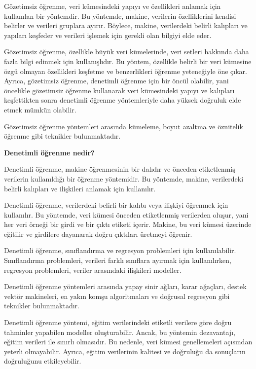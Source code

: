 \documentclass[11pt]{article}
\begin{document}
Gözetimsiz öğrenme, veri kümesindeki yapıyı ve özellikleri anlamak için kullanılan bir yöntemdir. Bu yöntemde, makine, verilerin özelliklerini kendisi belirler ve verileri gruplara ayırır. Böylece, makine, verilerdeki belirli kalıpları ve yapıları keşfeder ve verileri işlemek için gerekli olan bilgiyi elde eder.

Gözetimsiz öğrenme, özellikle büyük veri kümelerinde, veri setleri hakkında daha fazla bilgi edinmek için kullanışlıdır. Bu yöntem, özellikle belirli bir veri kümesine özgü olmayan özellikleri keşfetme ve benzerlikleri öğrenme yeteneğiyle öne çıkar. Ayrıca, gözetimsiz öğrenme, denetimli öğrenme için bir öncül olabilir, yani öncelikle gözetimsiz öğrenme kullanarak veri kümesindeki yapıyı ve kalıpları keşfettikten sonra denetimli öğrenme yöntemleriyle daha yüksek doğruluk elde etmek mümkün olabilir.

Gözetimsiz öğrenme yöntemleri arasında kümeleme, boyut azaltma ve öznitelik öğrenme gibi teknikler bulunmaktadır.

\textbf{Denetimli öğrenme nedir?}

Denetimli öğrenme, makine öğrenmesinin bir dalıdır ve önceden etiketlenmiş verilerin kullanıldığı bir öğrenme yöntemidir. Bu yöntemde, makine, verilerdeki belirli kalıpları ve ilişkileri anlamak için kullanılır.

Denetimli öğrenme, verilerdeki belirli bir kalıbı veya ilişkiyi öğrenmek için kullanılır. Bu yöntemde, veri kümesi önceden etiketlenmiş verilerden oluşur, yani her veri örneği bir girdi ve bir çıktı etiketi içerir. Makine, bu veri kümesi üzerinde eğitilir ve girdilere dayanarak doğru çıktıları üretmeyi öğrenir.

Denetimli öğrenme, sınıflandırma ve regresyon problemleri için kullanılabilir. Sınıflandırma problemleri, verileri farklı sınıflara ayırmak için kullanılırken, regresyon problemleri, veriler arasındaki ilişkileri modeller.

Denetimli öğrenme yöntemleri arasında yapay sinir ağları, karar ağaçları, destek vektör makineleri, en yakın komşu algoritmaları ve doğrusal regresyon gibi teknikler bulunmaktadır.

Denetimli öğrenme yöntemi, eğitim verilerindeki etiketli verilere göre doğru tahminler yapabilen modeller oluşturabilir. Ancak, bu yöntemin dezavantajı, eğitim verileri ile sınırlı olmasıdır. Bu nedenle, veri kümesi genellemeleri açısından yeterli olmayabilir. Ayrıca, eğitim verilerinin kalitesi ve doğruluğu da sonuçların doğruluğunu etkileyebilir.
\end{document}
